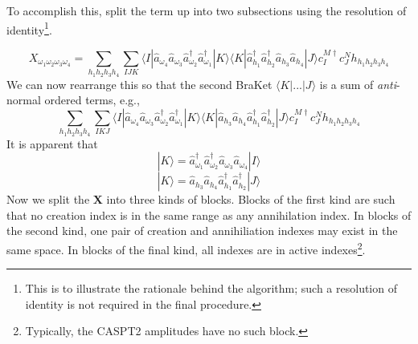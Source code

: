 \documentclass[12pt]{article}
\begin{document}
\noindent To accomplish this, split the term up into two
subsections using the resolution of identity\footnote{This is to illustrate the
rationale behind the algorithm; such a resolution of identity is not required
in the final procedure.}.

\begin{equation}
X_{\omega_{1}\omega_{2}\omega_{3}\omega_{4}}
= 
\sum_{ h_{1}h_{2}h_{3}h_{4}} 
\sum_{IJK}
\langle I |
\hat{a}_{\omega_{4}} \hat{a}_{\omega_{3}}\hat{a}^{\dagger}_{\omega_{2}}\hat{a}^{\dagger}_{\omega_{1}}
| K \rangle \langle K | 
\hat{a}^{\dagger}_{h_{1}} \hat{a}^{\dagger}_{h_{2}}\hat{a}_{h_{3}}\hat{a}_{h_{4}}| J \rangle  
c^{M \dagger}_{I}c^{N}_{J} h_{h_{1}h_{2}h_{3}h_{4}}
\label{eqn:X_RI_H_example}
\end{equation}
\noindent We can now rearrange this so that the second BraKet $\langle K | ... | J \rangle$ is a sum of \emph{anti}-normal ordered terms, e.g.,
\begin{equation}
\sum_{ h_{1}h_{2}h_{3}h_{4}} 
\sum_{IKJ}
\langle I |
\hat{a}_{\omega_{4}} \hat{a}_{\omega_{3}}\hat{a}^{\dagger}_{\omega_{2}}\hat{a}^{\dagger}_{\omega_{1}}
| K \rangle \langle K | 
\hat{a}_{h_{3}}\hat{a}_{h_{4}}\hat{a}^{\dagger}_{h_{1}} \hat{a}^{\dagger}_{h_{2}}| J \rangle  
c^{M \dagger}_{I}c^{N}_{J} h_{h_{1}h_{2}h_{3}h_{4}}
\label{eqn:X_RI_H_anti_normal1}
\end{equation}
It is apparent that 
\begin{equation}
|K\rangle = \hat{a}_{\omega_{1}}^{\dagger} \hat{a}_{\omega_{2}}^{\dagger}\hat{a}_{\omega_{3}}\hat{a}_{\omega_{4}} |I \rangle
\label{eqn:KI}
\end{equation}
\begin{equation}
|K\rangle =\hat{a}_{h_{3}}\hat{a}_{h_{4}}\hat{a}^{\dagger}_{h_{1}} \hat{a}^{\dagger}_{h_{2}}|J \rangle
\label{eqn:KJ}
\end{equation}
\noindent Now we split the $\mathbf{X}$ into three kinds of blocks. Blocks of
the first kind are such that no creation index is in the same range as any
annihilation index. In blocks of the second kind, one pair of creation and
annihiliation indexes may exist in the same space.  In blocks of the final
kind, all indexes are in active indexes\footnote{Typically, the CASPT2
amplitudes have no such block.}. \\
 
\end{document}
